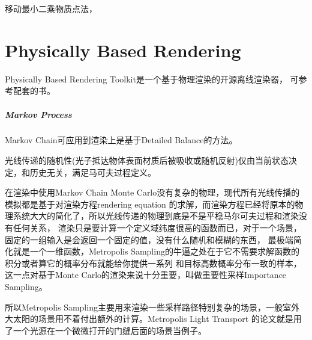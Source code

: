 移动最小二乘物质点法，

\chapter{Physically Based Rendering}

Physically Based Rendering Toolkit是一个基于物理渲染的开源离线渲染器， 可参考配套的书\cite{PBR3ed}。



\paragraph{Markov Process}

Markov Chain可应用到渲染上是基于Detailed Balance的方法。

光线传递的随机性(光子抵达物体表面材质后被吸收或随机反射)仅由当前状态决定，和历史无关，满足马可夫过程定义。

在渲染中使用Markov Chain Monte Carlo没有复杂的物理，现代所有光线传播的模拟都是基于对渲染方程rendering equation
的求解，而渲染方程已经将原本的物理系统大大的简化了，所以光线传递的物理到底是不是平稳马尔可夫过程和渲染没有任何关系，
渲染只是要计算一个定义域纬度很高的函数而已，对于一个场景，固定的一组输入是会返回一个固定的值，没有什么随机和模糊的东西，
最极端简化就是一个一维函数，Metropolis Sampling的牛逼之处在于它不需要求解函数的积分或者算它的概率分布就能给你提供一系列
和目标高数概率分布一致的样本，这一点对基于Monte Carlo的渲染来说十分重要，叫做重要性采样Importance Sampling。

所以Metropolis Sampling主要用来渲染一些采样路径特别复杂的场景，一般室外大太阳的场景用不着付出额外的计算。Metropolis Light Transport
的论文就是用了一个光源在一个微微打开的门缝后面的场景当例子。
